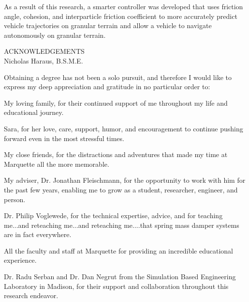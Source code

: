 \documentclass[12pt,onecolumn]{report}
\begin{document}
\begin{singlespacing}
As a result of this research, a smarter controller was developed that uses friction angle, cohesion, and interparticle friction coefficient to more accurately predict vehicle trajectories on granular terrain and allow a vehicle to navigate autonomously on granular terrain. 


\vfill
\end{singlespacing}
\newpage

\setcounter{page}{1}
\begin{singlespacing}
\begin{centering}
ACKNOWLEDGEMENTS\\
\vspace{0.2in}
Nicholas Haraus, B.S.M.E.\\
\end{centering}
\vspace{0.2in}

Obtaining a degree has not been a solo pursuit, and therefore I would like to express my deep appreciation and gratitude in no particular order to:
\vspace{0.2in}

My loving family, for their continued support of me throughout my life and educational journey.


Sara, for her love, care, support, humor, and encouragement to continue pushing forward even in the most stressful times.


My close friends, for the distractions and adventures that made my time at Marquette all the more memorable.


My adviser, Dr. Jonathan Fleischmann, for the opportunity to work with him for the past few years, enabling me to grow as a student, researcher, engineer, and person. 


Dr. Philip Voglewede, for the technical expertise, advice, and for teaching me...and reteaching me...and reteaching me....that spring mass damper systems are in fact everywhere.


All the faculty and staff at Marquette for providing an incredible educational experience.


Dr. Radu Serban and Dr. Dan Negrut from the Simulation Based Engineering Laboratory in Madison, for their support and collaboration throughout this research endeavor. 

\end{singlespacing}
\end{document}
